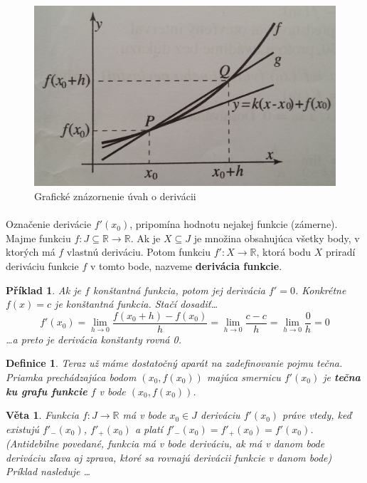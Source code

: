 \documentclass[12pt,a4paper]{article}
\newtheorem{definition}{Definice}
\newtheorem{sentence}{Věta}
\newtheorem{example}{Příklad}
\begin{document}
\begin{figure}[ht]
	\begin{center}
		\includegraphics[scale=0.16]{img/derivacia}
	\end{center}
	\caption{Grafické znázornenie úvah o derivácii\label{derivacia}}
\end{figure}

\paragraph{} Označenie derivácie $f'(x_{0})$, pripomína hodnotu nejakej funkcie (zámerne). Majme funkciu $f: J \subseteq \mathds{R} \rightarrow \mathds{R}$. Ak je $X\subseteq J$ je množina obsahujúca všetky body, v ktorých má $f$ vlastnú deriváciu. Potom funkciu $f':X\rightarrow \mathds{R}$, ktorá bodu $X$ priradí deriváciu funkcie $f$ v tomto bode, nazveme \textbf{derivácia funkcie}.

\begin{example}
	Ak je $f$ konštantná funkcia, potom jej derivácia $f'=0$. Konkrétne $f(x)=c$ je konštantná funkcia. Stačí dosadiť\dots \\ $$f'(x_{0})= \lim_{h\rightarrow 0}\frac{f(x_{0}+h)-f(x_{0})}{h}=\lim_{h\rightarrow 0}\frac{c-c}{h}=\lim_{h\rightarrow 0}\frac{0}{h}=0$$ \dots a preto je derivácia konštanty rovná 0.
\end{example}

\begin{definition}
	Teraz už máme dostatočný aparát na zadefinovanie pojmu tečna. Priamka prechádzajúca bodom $(x_{0}, f(x_{0}))$ majúca smernicu $f'(x_{0})$ je \textbf{tečna ku grafu funkcie} $f$ v bode $(x_{0}, f(x_{0}))$.
\end{definition}

\begin{sentence}
	Funkcia $f:J\rightarrow \mathds{R}$ má v bode $x_{0}\in J$ deriváciu $f'(x_{0})$ práve vtedy, keď existujú $f'_{-}(x_{0})$, $f'_{+}(x_{0})$ a platí $f'_{-}(x_{0})=f'_{+}(x_{0})=f'(x_{0})$. (Antidebilne povedané, funkcia má v bode deriváciu, ak má v danom bode deriváciu zľava aj zprava, ktoré sa rovnajú derivácii funkcie v danom bode) Príklad nasleduje \dots
\end{sentence}
\end{document}
